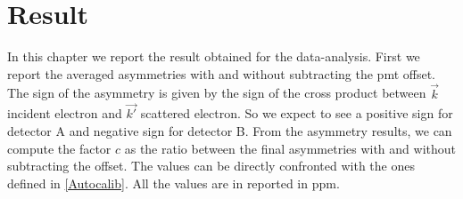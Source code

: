\chapter{Result} \label{result}


In this chapter we report the result obtained for the data-analysis. First we report the averaged asymmetries with and without subtracting the pmt offset. The sign of the asymmetry is given by the sign of the cross product between $\vec{k}$ incident electron and $\vec{k'}$ scattered electron. So we expect to see a positive sign for detector A and negative sign for detector B. From the asymmetry results, we can compute the factor $c$ as the ratio between the final asymmetries with and without subtracting the offset. The values can be directly confronted with the ones defined in \ref{Autocalib}. All the values are in reported in ppm.

